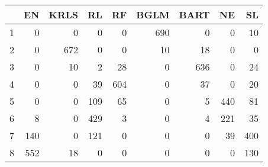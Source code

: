 \begin{table}[ht]
\centering
\begin{tabular}{rrrrrrrrr}
  \hline
 & EN & KRLS & RL & RF & BGLM & BART & NE & SL \\ 
  \hline
1 &   0 &   0 &   0 &   0 & 690 &   0 &   0 &  10 \\ 
  2 &   0 & 672 &   0 &   0 &  10 &  18 &   0 &   0 \\ 
  3 &   0 &  10 &   2 &  28 &   0 & 636 &   0 &  24 \\ 
  4 &   0 &   0 &  39 & 604 &   0 &  37 &   0 &  20 \\ 
  5 &   0 &   0 & 109 &  65 &   0 &   5 & 440 &  81 \\ 
  6 &   8 &   0 & 429 &   3 &   0 &   4 & 221 &  35 \\ 
  7 & 140 &   0 & 121 &   0 &   0 &   0 &  39 & 400 \\ 
  8 & 552 &  18 &   0 &   0 &   0 &   0 &   0 & 130 \\ 
   \hline
\end{tabular}
\end{table}

